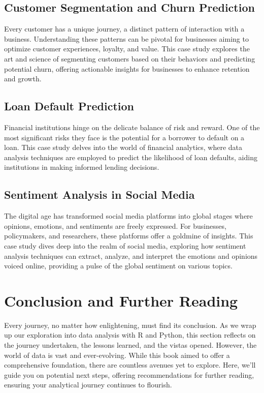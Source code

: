 \documentclass{book}
\begin{document}
\section{Customer Segmentation and Churn Prediction}
Every customer has a unique journey, a distinct pattern of interaction with a business. Understanding these patterns can be pivotal for businesses aiming to optimize customer experiences, loyalty, and value. This case study explores the art and science of segmenting customers based on their behaviors and predicting potential churn, offering actionable insights for businesses to enhance retention and growth.

\section{Loan Default Prediction}
Financial institutions hinge on the delicate balance of risk and reward. One of the most significant risks they face is the potential for a borrower to default on a loan. This case study delves into the world of financial analytics, where data analysis techniques are employed to predict the likelihood of loan defaults, aiding institutions in making informed lending decisions.

\section{Sentiment Analysis in Social Media}
The digital age has transformed social media platforms into global stages where opinions, emotions, and sentiments are freely expressed. For businesses, policymakers, and researchers, these platforms offer a goldmine of insights. This case study dives deep into the realm of social media, exploring how sentiment analysis techniques can extract, analyze, and interpret the emotions and opinions voiced online, providing a pulse of the global sentiment on various topics.

\chapter*{Conclusion and Further Reading}
Every journey, no matter how enlightening, must find its conclusion. As we wrap up our exploration into data analysis with R and Python, this section reflects on the journey undertaken, the lessons learned, and the vistas opened. However, the world of data is vast and ever-evolving. While this book aimed to offer a comprehensive foundation, there are countless avenues yet to explore. Here, we'll guide you on potential next steps, offering recommendations for further reading, ensuring your analytical journey continues to flourish.
\end{document}
